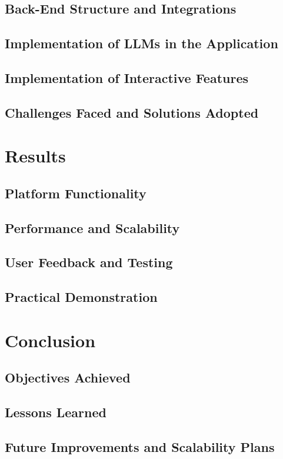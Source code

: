 \documentclass[tcc,capa]{texufpel}
\begin{document}
\section{Back-End Structure and Integrations}
\section{Implementation of LLMs in the Application}
\section{Implementation of Interactive Features}
\section{Challenges Faced and Solutions Adopted}

\chapter{Results}
\section{Platform Functionality}
\section{Performance and Scalability}
\section{User Feedback and Testing}
\section{Practical Demonstration}

\chapter{Conclusion}
\section{Objectives Achieved}
\section{Lessons Learned}
\section{Future Improvements and Scalability Plans}
\end{document}
